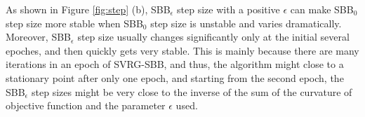 \documentclass[letterpaper]{article} %
\begin{document}
As shown in Figure \ref{fig:step} (b), SBB$_\epsilon$ step size with a positive $\epsilon$ can make SBB$_0$ step size more stable when SBB$_0$ step size is unstable and varies dramatically. Moreover, SBB$_\epsilon$ step size usually changes significantly only at the initial several epoches, and then quickly gets very stable. This is mainly because there are many iterations in an epoch of SVRG-SBB, and thus, the algorithm might close to a stationary point after only one epoch, and starting from the second epoch, the SBB$_\epsilon$ step sizes might be very close to the inverse of the sum of the curvature of objective function and the parameter $\epsilon$ used.

\end{document}
